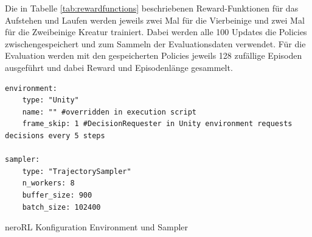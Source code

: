 Die in Tabelle \ref{tab:rewardfunctions} beschriebenen Reward-Funktionen für das Aufstehen und Laufen werden jeweils zwei Mal für die Vierbeinige und zwei Mal für die Zweibeinige Kreatur trainiert. Dabei werden alle 100 Updates die Policies zwischengespeichert und zum Sammeln der Evaluationsdaten verwendet. Für die Evaluation werden mit den gespeicherten Policies jeweils 128 zufällige Episoden ausgeführt und dabei Reward und Episodenlänge gesammelt.

\begin{listing}
	\begin{verbatim}
environment:
    type: "Unity"
    name: "" #overridden in execution script
    frame_skip: 1 #DecisionRequester in Unity environment requests decisions every 5 steps

sampler:
    type: "TrajectorySampler"
    n_workers: 8
    buffer_size: 900 
    batch_size: 102400
		\end{verbatim}
	\caption{neroRL Konfiguration Environment und Sampler}
	\label{fig:evaluation_config_environment_sampler}
\end{listing}

